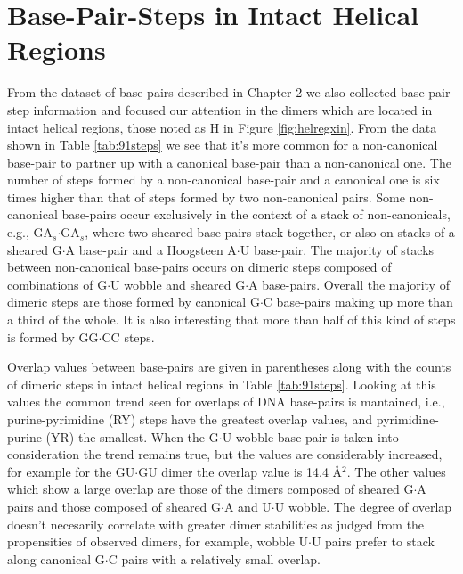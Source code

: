 \section{Base-Pair-Steps in Intact Helical Regions}
From  the  dataset  of  base-pairs  described in  Chapter  2  we  also
collected base-pair step information  and focused our attention in the
dimers which are  located in intact helical regions,  those noted as H
in  Figure   \ref{fig:helregxin}.   From  the  data   shown  in  Table
\ref{tab:91steps}  we see that  it's more  common for  a non-canonical
base-pair   to  partner  up   with  a   canonical  base-pair   than  a
non-canonical  one.  The  number of  steps formed  by  a non-canonical
base-pair and a  canonical one is six times higher  than that of steps
formed  by  two non-canonical  pairs.   Some non-canonical  base-pairs
occur exclusively in  the context of a stack  of non-canonicals, e.g.,
GA$_{s}$$\cdot$GA$_{s}$, where two  sheared base-pairs stack together,
or also  on stacks  of a sheared  G$\cdot$A base-pair and  a Hoogsteen
A$\cdot$U  base-pair.  The  majority of  stacks  between non-canonical
base-pairs  occurs  on  dimeric  steps  composed  of  combinations  of
G$\cdot$U  wobble  and  sheared  G$\cdot$A  base-pairs.   Overall  the
majority  of dimeric  steps are  those formed  by  canonical G$\cdot$C
base-pairs  making up  more than  a third  of the  whole.  It  is also
interesting that  more than half  of this kind  of steps is  formed by
GG$\cdot$CC steps.

Overlap values between base-pairs  are given in parentheses along with
the  counts  of dimeric  steps  in  intact  helical regions  in  Table
\ref{tab:91steps}. Looking  at this values  the common trend  seen for
overlaps of DNA base-pairs  is mantained, i.e., purine-pyrimidine (RY)
steps have the greatest overlap values, and pyrimidine-purine (YR) the
smallest.   When   the  G$\cdot$U  wobble  base-pair   is  taken  into
consideration the trend remains  true, but the values are considerably
increased, for example for the  GU$\cdot$GU dimer the overlap value is
14.4 \AA$^{\text{2}}$.   The other values  which show a  large overlap
are those of the dimers  composed of sheared G$\cdot$A pairs and those
composed  of sheared G$\cdot$A  and U$\cdot$U  wobble.  The  degree of
overlap doesn't necesarily correlate with greater dimer stabilities as
judged from  the propensities of observed dimers,  for example, wobble
U$\cdot$U pairs prefer to stack along canonical G$\cdot$C pairs with a
relatively small overlap.

